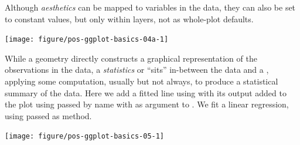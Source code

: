 \documentclass[krantz2]{krantz}\usepackage{knitr}%
\begin{document}
Although \emph{aesthetics} can be mapped to variables in the data, they can also be set to constant values, but only within layers, not as whole-plot defaults.

\begin{knitrout}\footnotesize
{}\color{fgcolor}\begin{kframe}
\begin{alltt}
\hlstd{(} 
       \hlstd{(}    \hlopt{+}
  \hlstd{(} \hlstd{=} \hlstd{,}  \hlstd{=} \hlstd{)}
\end{alltt}
\end{kframe}

{\centering \texttt{[image: figure/pos-ggplot-basics-04a-1]} 

}



\end{knitrout}

While a geometry directly constructs a graphical representation of the observations in the data, a \emph{statistics} or  ``sits'' in-between the data and a , applying some computation, usually but not always, to produce a statistical summary of the data. Here we add a fitted line using  with its output added to the plot using  passed by name with  as argument to . We fit a linear regression, using  passed as method.

\begin{knitrout}\footnotesize
{}\color{fgcolor}\begin{kframe}
\begin{alltt}
\hlstd{(} 
       \hlstd{(}    \hlopt{+}
  \hlstd{()} \hlopt{+}
  \hlstd{(} \hlstd{=} \hlstd{,}  \hlstd{=} \hlstd{)}
\end{alltt}
\end{kframe}

{\centering \texttt{[image: figure/pos-ggplot-basics-05-1]} 

}



\end{knitrout}
\end{document}
